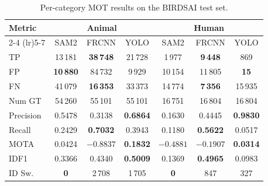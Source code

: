\documentclass[
]{article}
\begin{document}
\begin{table}[htbp]
\centering
\begin{tabular}{l ccc ccc}
\toprule
\textbf{Metric} & \multicolumn{3}{c}{\textbf{Animal}} & \multicolumn{3}{c}{\textbf{Human}} \\
\cmidrule(lr){2-4} \cmidrule(lr){5-7}
 & SAM2 & FRCNN & YOLO & SAM2 & FRCNN & YOLO \\
\midrule
TP        & 13\,181          & \textbf{38\,748} & 21\,728          & 1\,977           & \textbf{9\,448}  & 869     \\
FP        & \textbf{10\,880} & 84\,732          & 9\,929           & 10\,154          & 11\,805          & \textbf{15} \\
FN        & 41\,079          & \textbf{16\,353} & 33\,373          & 14\,774          & \textbf{7\,356}  & 15\,935 \\
Num GT    & 54\,260          & 55\,101          & 55\,101          & 16\,751          & 16\,804          & 16\,804 \\
Precision & 0.5478           & 0.3138           & \textbf{0.6864}  & 0.1630           & 0.4445           & \textbf{0.9830} \\
Recall    & 0.2429           & \textbf{0.7032}  & 0.3943           & 0.1180           & \textbf{0.5622}  & 0.0517  \\
MOTA      & 0.0424           & $-0.8837$        & \textbf{0.1832}  & $-0.4881$        & $-0.1907$        & \textbf{0.0314} \\
IDF1      & 0.3366           & 0.4340           & \textbf{0.5009}  & 0.1369           & \textbf{0.4965}  & 0.0983  \\
ID Sw.    & \textbf{0}       & 2\,708           & 1\,705           & \textbf{0}       & 847              & 327     \\
\bottomrule
\end{tabular}
\caption{Per-category MOT results on the BIRDSAI test set.}
\label{tab:mot-per-category}
\end{table}
\end{document}
